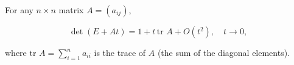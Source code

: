 For any $n \times n$ matrix $A = (a_{ij})$,

$$\det(E + At) = 1 + t \, \text{tr } A + O(t^2), \quad t \to 0,$$

where $\text{tr } A = \sum_{i=1}^{n} a_{ii}$ is the trace of $A$ (the sum of the diagonal elements).
